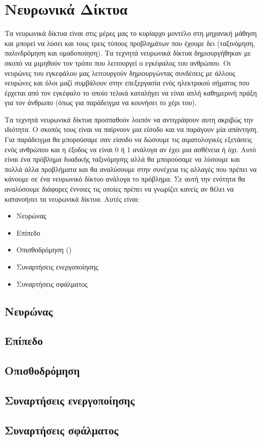 \newpage
\section{Νευρωνικά Δίκτυα}
Τα νευρωνικά δίκτυα είναι στις μέρες μας το κυρίαρχο μοντέλο στη μηχανική μάθηση και μπορεί να λύσει και τους τρεις τύπους προβλημάτων που έχουμε δει (ταξινόμηση, παλινδρόμηση και ομαδοποίηση). Τα τεχνητά νευρωνικά δίκτυα δημιουργήθηκαν με
σκοπό να μιμηθούν τον τρόπο που λειτουργεί ο εγκέφαλος του ανθρώπου. Οι νευρώνες του εγκεφάλου μας λειτουργούν δημιουργώντας συνδέσεις με άλλους νευρώνες και όλοι μαζί συμβάλουν στην επεξεργασία ενός ηλεκτρικού σήματος που έρχεται από τον
εγκέφαλο το οποίο τελικά καταλήγει να είναι απλή καθημερινή πράξη για τον άνθρωπο (όπως για παράδειγμα να κουνήσει το χέρι του)\cite{nnip}.

Τα τεχνητά νευρωνικά δίκτυα προσπαθούν λοιπόν να αντιγράψουν αυτη ακριβώς την ιδιότητα. Ο σκοπός τους είναι να παίρνουν μια είσοδο και να παράγουν μία απάντηση. Για παράδειγμα θα μπορούσαμε σαν είσοδο να δώσουμε τις αιματολογικές εξετάσεις
ενός ανθρώπου και η έξοδος να είναι 0 ή 1 ανάλογα αν έχει μια ασθένεια ή όχι. Αυτό είναι ένα πρόβλημα δυαδικής ταξινόμησης αλλά θα μπορούσαμε να λύσουμε και πολλά άλλα προβλήματα και θα αναλύσουμε στην συνέχεια τις αλλαγές που πρέπει να
κάνουμε σε ένα νευρωνικό δίκτυο ανάλογα το πρόβλημα. Σε αυτή την ενότητα θα αναλύσουμε διάφορες έννοιες τις οποίες πρέπει να γνωρίζει κανείς αν θέλει να κατανοήσει τα νευρωνικά δίκτυα. Αυτές είναι\cite{nnav}:
\begin{itemize}
    \item Νευρώνας
    \item Επίπεδο
    \item Οπισθοδρόμηση ()
    \item Συναρτήσεις ενεργοποίησης
    \item Συναρτήσεις σφάλματος
\end{itemize}

\subsection{Νευρώνας}
\subsection{Επίπεδο}
\subsection{Οπισθοδρόμηση}
\subsection{Συναρτήσεις ενεργοποίησης}
\subsection{Συναρτήσεις σφάλματος}